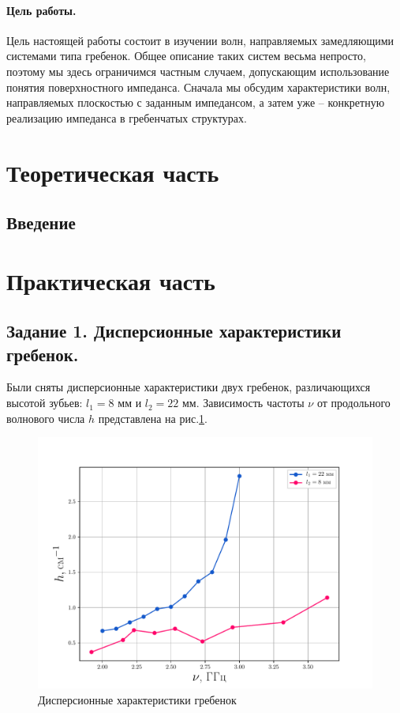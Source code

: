 

\def\labauthors{Войтович Д.А., Понур К.А.}
\def\labgroup{440}
\def\labnumber{2}
\def\labtheme{Замедляющие системы типа гребенки}
\def\department{Кафедра электродинамики}

\newpage
\paragraph{Цель работы.} 

Цель настоящей работы состоит в изучении волн, направляемых замедляющими системами типа гребенок. Общее описание таких систем весьма непросто, поэтому мы здесь ограничимся частным случаем, допускающим использование понятия поверхностного импеданса. Сначала мы обсудим характеристики волн, направляемых плоскостью с заданным импедансом, а затем уже --
конкретную реализацию импеданса в гребенчатых структурах.

\section{Теоретическая часть}
\subsection{Введение}



\section{Практическая часть} %
\subsection*{Задание 1. Дисперсионные характеристики гребенок.} %
Были сняты дисперсионные характеристики двух гребенок, различающихся высотой зубьев: $l_1 = 8$ мм и $l_2 = 22 $ мм.
Зависимость частоты  $\nu$ от продольного волнового числа  $h$ представлена на рис.\ref{fig:1}.
\begin{figure}[h!]
\centering
\includegraphics[width=0.9\linewidth]{rec/task1.pdf}
\caption{Дисперсионные характеристики гребенок}
\label{fig:1}
\end{figure}

